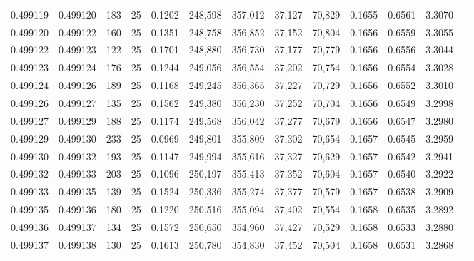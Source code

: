\begin{tabular}{rrrrrrrrrrrrr}
0.499119 & 0.499120 & 183 &  25 &                                     0.1202 & 248,598 & 357,012 &  37,127 &  70,829 & 0.1655 & 0.6561 & 3.3070 \\
0.499120 & 0.499122 & 160 &  25 &                                     0.1351 & 248,758 & 356,852 &  37,152 &  70,804 & 0.1656 & 0.6559 & 3.3055 \\
0.499122 & 0.499123 & 122 &  25 &                                     0.1701 & 248,880 & 356,730 &  37,177 &  70,779 & 0.1656 & 0.6556 & 3.3044 \\
0.499123 & 0.499124 & 176 &  25 &                                     0.1244 & 249,056 & 356,554 &  37,202 &  70,754 & 0.1656 & 0.6554 & 3.3028 \\
0.499124 & 0.499126 & 189 &  25 &                                     0.1168 & 249,245 & 356,365 &  37,227 &  70,729 & 0.1656 & 0.6552 & 3.3010 \\
0.499126 & 0.499127 & 135 &  25 &                                     0.1562 & 249,380 & 356,230 &  37,252 &  70,704 & 0.1656 & 0.6549 & 3.2998 \\
0.499127 & 0.499129 & 188 &  25 &                                     0.1174 & 249,568 & 356,042 &  37,277 &  70,679 & 0.1656 & 0.6547 & 3.2980 \\
0.499129 & 0.499130 & 233 &  25 &                                     0.0969 & 249,801 & 355,809 &  37,302 &  70,654 & 0.1657 & 0.6545 & 3.2959 \\
0.499130 & 0.499132 & 193 &  25 &                                     0.1147 & 249,994 & 355,616 &  37,327 &  70,629 & 0.1657 & 0.6542 & 3.2941 \\
0.499132 & 0.499133 & 203 &  25 &                                     0.1096 & 250,197 & 355,413 &  37,352 &  70,604 & 0.1657 & 0.6540 & 3.2922 \\
0.499133 & 0.499135 & 139 &  25 &                                     0.1524 & 250,336 & 355,274 &  37,377 &  70,579 & 0.1657 & 0.6538 & 3.2909 \\
0.499135 & 0.499136 & 180 &  25 &                                     0.1220 & 250,516 & 355,094 &  37,402 &  70,554 & 0.1658 & 0.6535 & 3.2892 \\
0.499136 & 0.499137 & 134 &  25 &                                     0.1572 & 250,650 & 354,960 &  37,427 &  70,529 & 0.1658 & 0.6533 & 3.2880 \\
0.499137 & 0.499138 & 130 &  25 &                                     0.1613 & 250,780 & 354,830 &  37,452 &  70,504 & 0.1658 & 0.6531 & 3.2868 \\

\end{tabular}
